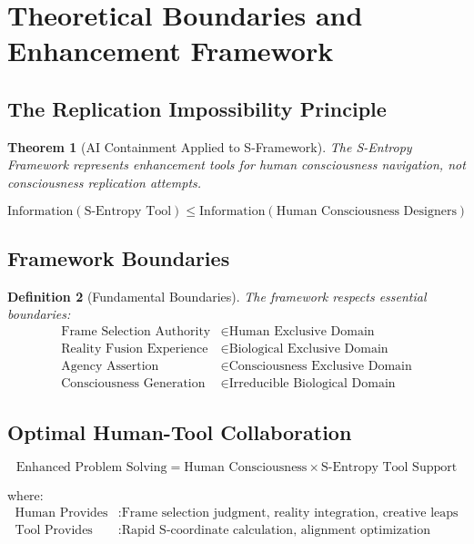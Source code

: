 \documentclass[12pt,a4paper]{article}
\newtheorem{theorem}{Theorem}[section]
\newtheorem{definition}[theorem]{Definition}
\begin{document}
\section{Theoretical Boundaries and Enhancement Framework}

\subsection{The Replication Impossibility Principle}

\begin{theorem}[AI Containment Applied to S-Framework]
The S-Entropy Framework represents enhancement tools for human consciousness navigation, not consciousness replication attempts.
\end{theorem}

\begin{equation}
\text{Information}(\text{S-Entropy Tool}) \leq \text{Information}(\text{Human Consciousness Designers})
\end{equation}

\subsection{Framework Boundaries}

\begin{definition}[Fundamental Boundaries]
The framework respects essential boundaries:
\begin{align}
\text{Frame Selection Authority} &\in \text{Human Exclusive Domain} \\
\text{Reality Fusion Experience} &\in \text{Biological Exclusive Domain} \\
\text{Agency Assertion} &\in \text{Consciousness Exclusive Domain} \\
\text{Consciousness Generation} &\in \text{Irreducible Biological Domain}
\end{align}
\end{definition}

\subsection{Optimal Human-Tool Collaboration}

\begin{equation}
\text{Enhanced Problem Solving} = \text{Human Consciousness} \times \text{S-Entropy Tool Support}
\end{equation}

where:
\begin{align}
\text{Human Provides} &: \text{Frame selection judgment, reality integration, creative leaps} \\
\text{Tool Provides} &: \text{Rapid S-coordinate calculation, alignment optimization}
\end{align}
\end{document}
